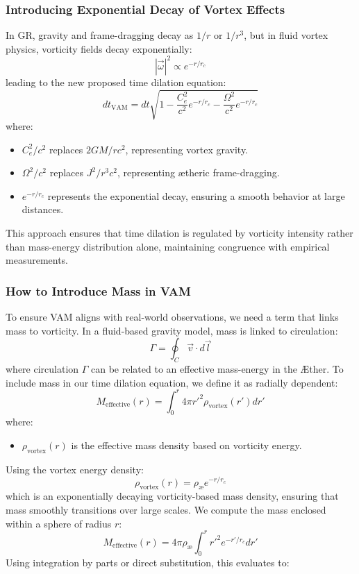 \documentclass[a4paper,10pt]{article}
\begin{document}
\subsubsection*{Introducing Exponential Decay of Vortex Effects}
In GR, gravity and frame-dragging decay as $1/r$ or $1/r^3$, but in fluid vortex physics, vorticity fields decay exponentially:
\begin{equation*}
    |\vec{\omega}|^2 \propto e^{-r/r_c}
\end{equation*}
leading to the new proposed time dilation equation:
\begin{equation*}
    dt_\text{VAM} = dt \sqrt{1 - \frac{C_e^2}{c^2} e^{-r/r_c} - \frac{\Omega^2}{c^2} e^{-r/r_c}}
\end{equation*}
where:
\begin{itemize}
    \item $C_e^2/c^2$ replaces $2GM/r c^2$, representing vortex gravity.
    \item $\Omega^2/c^2$ replaces $J^2/r^3 c^2$, representing ætheric frame-dragging.
    \item $e^{-r/r_c}$ represents the exponential decay, ensuring a smooth behavior at large distances.
\end{itemize}
This approach ensures that time dilation is regulated by vorticity intensity rather than mass-energy distribution alone, maintaining congruence with empirical measurements.

\subsubsection*{How to Introduce Mass in VAM}
To ensure VAM aligns with real-world observations, we need a term that links mass to vorticity. In a fluid-based gravity model, mass is linked to circulation:
\begin{equation*}
    \Gamma = \oint_C \vec{v} \cdot d\vec{l}
\end{equation*}
where circulation $\Gamma$ can be related to an effective mass-energy in the Æther. To include mass in our time dilation equation, we define it as radially dependent:
\begin{equation*}
    M_\text{effective}(r) = \int_0^r 4\pi r'^2 \rho_\text{vortex}(r') dr'
\end{equation*}
where:
\begin{itemize}
    \item $\rho_\text{vortex}(r)$ is the effective mass density based on vorticity energy.
\end{itemize}
Using the vortex energy density:
\begin{equation*}
    \rho_\text{vortex}(r) = \rho_\text{\ae} e^{-r / r_c}
\end{equation*}
which is an exponentially decaying vorticity-based mass density, ensuring that mass smoothly transitions over large scales. We compute the mass enclosed within a sphere of radius $r$:
\begin{equation*}
    M_\text{effective}(r) = 4\pi \rho_\text{\ae} \int_0^r r'^2 e^{-r' / r_c} dr'
\end{equation*}
Using integration by parts or direct substitution, this evaluates to:
\end{document}
